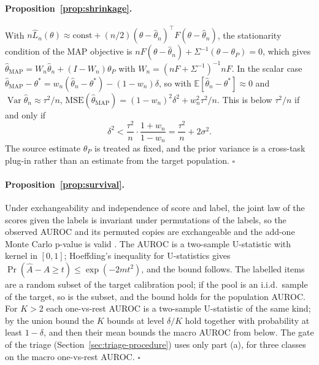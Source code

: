 \paragraph{Proposition~\ref{prop:shrinkage}.}
With $n\hat L_n(\theta) \approx \mathrm{const} + (n/2)(\theta - \hat\theta_n)^\top F (\theta - \hat\theta_n)$, the
stationarity condition of the MAP objective is $nF(\theta - \hat\theta_n) + \Sigma^{-1}(\theta - \theta_P) = 0$, which
gives $\hat\theta_{\mathrm{MAP}} = W_n\hat\theta_n + (I - W_n)\theta_P$ with $W_n = (nF + \Sigma^{-1})^{-1}nF$. In the
scalar case $\hat\theta_{\mathrm{MAP}} - \theta^* = w_n(\hat\theta_n - \theta^*) - (1 - w_n)\delta$, so with
$\mathbb{E}[\hat\theta_n - \theta^*] \approx 0$ and $\operatorname{Var}\hat\theta_n \approx \tau^2/n$,
$\mathrm{MSE}(\hat\theta_{\mathrm{MAP}}) = (1 - w_n)^2\delta^2 + w_n^2\tau^2/n$. This is below $\tau^2/n$ if and only if
\[
  \delta^2 < \frac{\tau^2}{n} \cdot \frac{1 + w_n}{1 - w_n} = \frac{\tau^2}{n} + 2\sigma^2 .
\]
The source estimate $\theta_P$ is treated as fixed, and the prior variance is a cross-task plug-in rather than an estimate from the target population.
$\square$

\paragraph{Proposition~\ref{prop:survival}.}
Under exchangeability and independence of score and label, the joint law of the scores given the labels is invariant
under permutations of the labels, so the observed AUROC and its permuted copies are exchangeable and the add-one Monte
Carlo p-value is valid \citep{phipson2010permutation}. The AUROC is a two-sample U-statistic with kernel in $[0, 1]$;
Hoeffding's inequality for U-statistics \citep{hoeffding1963} gives $\Pr(\hat A - A \ge t) \le \exp(-2mt^2)$, and the
bound follows. The labelled items are a random subset of the target calibration pool; if the pool is an i.i.d.\ sample of
the target, so is the subset, and the bound holds for the population AUROC. For $K > 2$ each one-vs-rest AUROC is a
two-sample U-statistic of the same kind; by the union bound the $K$ bounds at level $\delta/K$ hold together with
probability at least $1 - \delta$, and then their mean bounds the macro AUROC from below. The gate of the triage
(Section~\ref{sec:triage-procedure}) uses only part (a), for three classes on the macro one-vs-rest AUROC. $\square$

